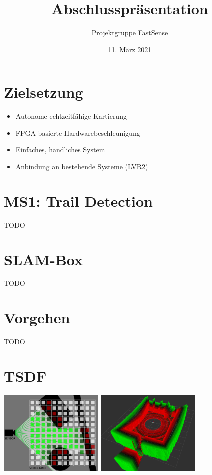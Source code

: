 \documentclass{beamer}
\title{Abschlusspräsentation}
\author{Projektgruppe FastSense}
\date{11. März 2021}
\begin{document}
{
\begin{frame}
\titlepage
\end{frame}}

\section{Zielsetzung}
\begin{frame}{\secname}
\begin{itemize}
\item Autonome echtzeitfähige Kartierung
\item FPGA-basierte Hardwarebeschleunigung
\item Einfaches, handliches System
\item Anbindung an bestehende Systeme (LVR2)
\end{itemize}
\end{frame}

\section{MS1: Trail Detection}
\begin{frame}{\secname}
TODO    
\end{frame}

\section{SLAM-Box}
\begin{frame}{\secname}
TODO
\end{frame}

\section{Vorgehen}
\begin{frame}{\secname}
TODO    
\end{frame}

\section{TSDF}
\begin{frame}{\secname}
\begin{center}
\includegraphics[width=5cm]{images/TSDF_Gen_new.png}
\includegraphics[width=5cm]{images/TSDF_3D.png}
\end{center}
\end{frame}
\end{document}
